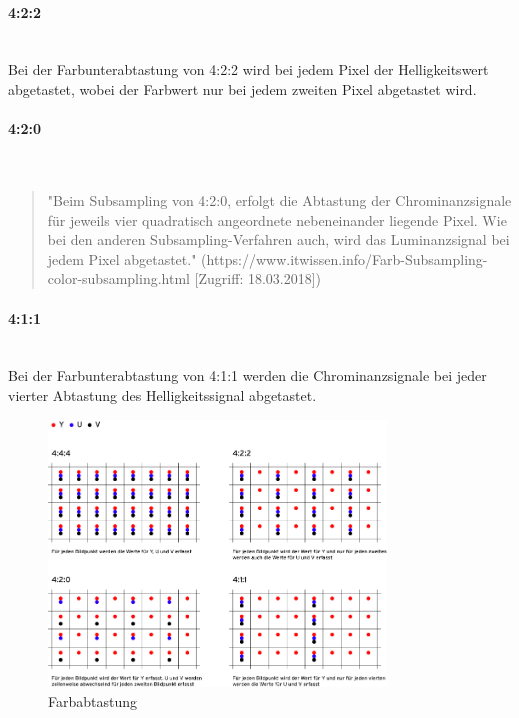 \paragraph{4:2:2}
\leavevmode \\
Bei der Farbunterabtastung von 4:2:2 wird bei jedem Pixel der Helligkeitswert abgetastet, wobei der Farbwert nur bei jedem zweiten Pixel abgetastet wird.\citep{farbabtastungZwei}
\paragraph{4:2:0}
\leavevmode \\
\begin{quote}"Beim Subsampling von 4:2:0, erfolgt die Abtastung der Chrominanzsignale für jeweils vier quadratisch angeordnete nebeneinander liegende Pixel. Wie bei den anderen Subsampling-Verfahren auch, wird das Luminanzsignal bei jedem Pixel abgetastet." (https://www.itwissen.info/Farb-Subsampling-color-subsampling.html [Zugriff: 18.03.2018])\end{quote}
\paragraph{4:1:1}
\leavevmode \\
Bei der Farbunterabtastung von 4:1:1 werden die Chrominanzsignale bei jeder vierter Abtastung des Helligkeitssignal abgetastet.\citep{farbabtastungZwei}
\begin{figure}[H]
	\centering	
	\includegraphics[width=0.8\textwidth]{abb15} 
	\caption[Farbabtastung]{Farbabtastung\footnotemark}
\end{figure}
